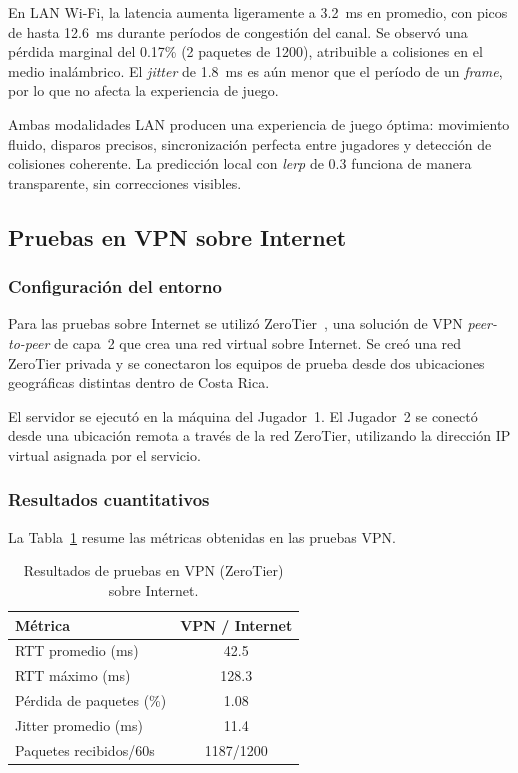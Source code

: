 \documentclass[conference]{IEEEtran}
\begin{document}
En LAN Wi-Fi, la latencia aumenta ligeramente a 3.2~ms en promedio, con picos de hasta 12.6~ms durante per\'iodos de congesti\'on del canal. Se observ\'o una p\'erdida marginal del 0.17\% (2 paquetes de 1200), atribuible a colisiones en el medio inal\'ambrico. El \textit{jitter} de 1.8~ms es a\'un menor que el per\'iodo de un \textit{frame}, por lo que no afecta la experiencia de juego.

Ambas modalidades LAN producen una experiencia de juego \'optima: movimiento fluido, disparos precisos, sincronizaci\'on perfecta entre jugadores y detecci\'on de colisiones coherente. La predicci\'on local con \textit{lerp} de 0.3 funciona de manera transparente, sin correcciones visibles.

\subsection{Pruebas en VPN sobre Internet}

\subsubsection{Configuraci\'on del entorno}

Para las pruebas sobre Internet se utiliz\'o ZeroTier~\cite{zerotier2024}, una soluci\'on de VPN \textit{peer-to-peer} de capa~2 que crea una red virtual sobre Internet. Se cre\'o una red ZeroTier privada y se conectaron los equipos de prueba desde dos ubicaciones geogr\'aficas distintas dentro de Costa Rica.

El servidor se ejecut\'o en la m\'aquina del Jugador~1. El Jugador~2 se conect\'o desde una ubicaci\'on remota a trav\'es de la red ZeroTier, utilizando la direcci\'on IP virtual asignada por el servicio.

\subsubsection{Resultados cuantitativos}

La Tabla~\ref{tab:vpn_results} resume las m\'etricas obtenidas en las pruebas VPN.

\begin{table}[!h]
\centering
\caption{Resultados de pruebas en VPN (ZeroTier) sobre Internet.}
\label{tab:vpn_results}
\begin{tabular}{@{}lc@{}}
\toprule
\textbf{M\'etrica} & \textbf{VPN / Internet} \\
\midrule
RTT promedio (ms)          & 42.5     \\
RTT m\'aximo (ms)          & 128.3    \\
P\'erdida de paquetes (\%) & 1.08     \\
Jitter promedio (ms)       & 11.4     \\
Paquetes recibidos/60s     & 1187/1200 \\
\bottomrule
\end{tabular}
\end{table}
\end{document}
